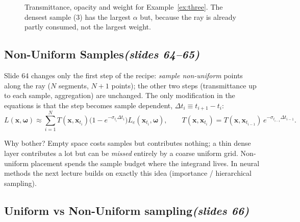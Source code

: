 \documentclass[11pt,a4paper]{article}
\newcommand{\slides}[1]{\texorpdfstring{\hfill{\normalfont\small\emph{(slides #1)}}}{ (slides #1)}}
\newcommand{\x}{\bm{x}}
\newcommand{\w}{\bm{\omega}}
\theoremstyle{remark}\newtheorem*{remark}{Remark}
\begin{document}
\begin{figure}[h]
\centering
{}
\caption{Transmittance, opacity and weight for Example~\ref{ex:three}. The densest sample (3) has the largest $\alpha$ but, because the ray is already partly consumed, not the largest weight.}
\end{figure}

\subsection{Non-Uniform Samples\slides{64--65}}

Slide 64 changes only the first step of the recipe: \emph{sample non-uniform} points along the ray ($N$ segments, $N+1$ points); the other two steps (transmittance up to each sample, aggregation) are unchanged. The only modification in the equations is that the step becomes sample dependent, $\Delta t_i\equiv t_{i+1}-t_i$:
\[
L(\x,\w)\approx\sum_{i=1}^NT(\x,\x_{t_i})\bigl(1-e^{-\sigma_{t_i}\Delta t_i}\bigr)L_e(\x_{t_i},\w),\qquad T(\x,\x_{t_i})=T(\x,\x_{t_{i-1}})\,e^{-\sigma_{t_{i-1}}\Delta t_{i-1}} .
\]

\begin{intuition}
Why bother? Empty space costs samples but contributes nothing; a thin dense layer contributes a lot but can be \emph{missed} entirely by a coarse uniform grid. Non-uniform placement spends the sample budget where the integrand lives. In neural methods the next lecture builds on exactly this idea (importance / hierarchical sampling).
\end{intuition}

\subsection{Uniform vs Non-Uniform sampling\slides{66}}
\end{document}
